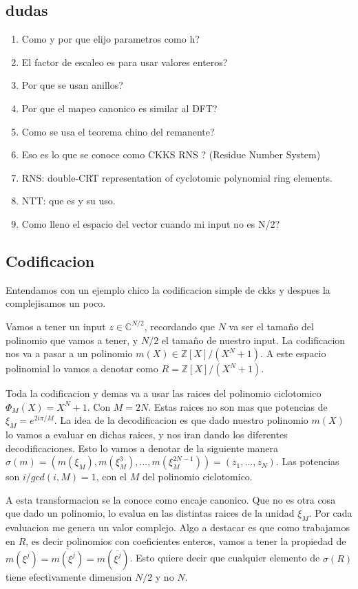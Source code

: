 \documentclass[12pt, oneside]{article}
\begin{document}
\subsection{dudas}
\begin{enumerate}
  \item Como y por que elijo parametros como h?
  \item El factor de escaleo es para usar valores enteros?
  \item Por que se usan anillos?
  \item Por que el mapeo canonico es similar al DFT?
  \item Como se usa el teorema chino del remanente?
  \item Eso es lo que se conoce como CKKS RNS ? (Residue Number System)
  \item RNS: double-CRT representation of cyclotomic polynomial ring elements.
  \item NTT: que es y su uso.
  \item Como lleno el espacio del vector cuando mi input no es N/2?
\end{enumerate}

\subsection{Codificacion}

Entendamos con un ejemplo chico la codificacion simple de ckks y despues la
complejisamos un poco.

Vamos a tener un input $z\in \mathbb{C}^{N/2}$, recordando que $N$ va ser el tamaño
del polinomio que vamos a tener, y $N/2$ el tamaño de nuestro input.
La codificacion nos va a pasar a un polinomio $m(X)\in \mathbb{Z}[X]/(X^N+1)$.
A este espacio polinomial lo vamos a denotar como $R= \mathbb{Z}[X]/(X^N+1)$.

Toda la codificacion y demas va a usar las raices del polinomio ciclotomico $\Phi_M(X)=
X^N+1$.
Con $M=2N$.
Estas raices no son mas que potencias de $\xi_M=e^{2i\pi/M}$.
La idea de la decodificacion es que dado nuestro polinomio $m(X)$ lo vamos a evaluar en dichas
raices, y nos iran dando los diferentes decodificaciones.
Esto lo vamos a denotar de la siguiente manera $\sigma(m) = (m(\xi_M), m(\xi_M^3),...,m(\xi_M^{2N-1}))=(z_1,...,z_N)$.
Las potencias son $i/gcd(i,M)=1$, con el $M$ del polinomio ciclotomico.

A esta transformacion se la conoce como encaje canonico.
Que no es otra cosa que dado un polinomio, lo evalua en las distintas raices de la unidad $\xi_M$.
Por cada evaluacion me genera un valor complejo.
Algo a destacar es que como trabajamos en  $R$, es decir polinomios con coeficientes enteros,
vamos a tener la propiedad de $m(\xi^j)=\overline{m(\xi^j)}=m(\overline{\xi^j})$.
Esto quiere decir que cualquier elemento de $\sigma(R)$ tiene efectivamente dimension
$N/2$ y no $N$.
\end{document}
